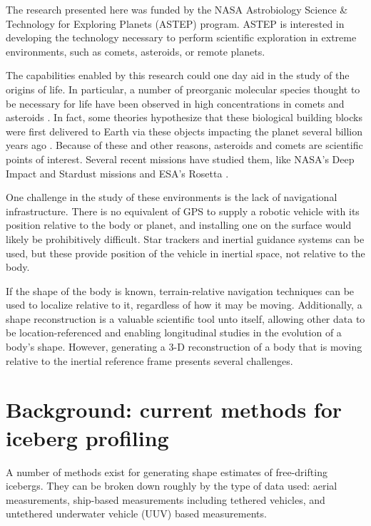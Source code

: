 The research presented here was funded by the NASA Astrobiology Science \& Technology for Exploring Planets (ASTEP) program. ASTEP is interested in developing the technology necessary to perform scientific  exploration in extreme environments, such as comets, asteroids, or remote planets.

The capabilities enabled by this research could one day aid in the study of the origins of life. In particular, a number of preorganic molecular species thought to be necessary for life have been observed in high concentrations in comets and asteroids \cite{Fomenkova1999}. In fact, some theories hypothesize that these biological building blocks were first delivered to Earth via these objects impacting the planet several billion years ago \cite{Chyba1992}. Because of these and other reasons, asteroids and comets are scientific points of interest. Several recent missions have studied them, like NASA's Deep Impact and Stardust missions\cite{Ahearn2005,Willcockson1999} and ESA's Rosetta \cite{Bibring2007}.

One challenge in the study of these environments is the lack of navigational infrastructure. There is no equivalent of GPS to supply a robotic vehicle with its position relative to the body or planet, and installing one on the surface would likely be prohibitively difficult. Star trackers and inertial guidance systems can be used, but these provide position of the vehicle in inertial space, not relative to the body.

If the shape of the body is known, terrain-relative navigation techniques can be used to localize relative to it, regardless of how it may be moving. Additionally, a shape reconstruction is a valuable scientific tool unto itself, allowing other data to be location-referenced and enabling longitudinal studies in the evolution of a body's shape. However, generating a 3-D reconstruction of a body that is moving relative to the inertial reference frame presents several challenges.

\section{Background: current methods for iceberg profiling}

A number of methods exist for generating shape estimates of free-drifting icebergs. They can be broken down roughly by the type of data used: aerial measurements, ship-based measurements including tethered vehicles, and untethered underwater vehicle (UUV) based measurements.

